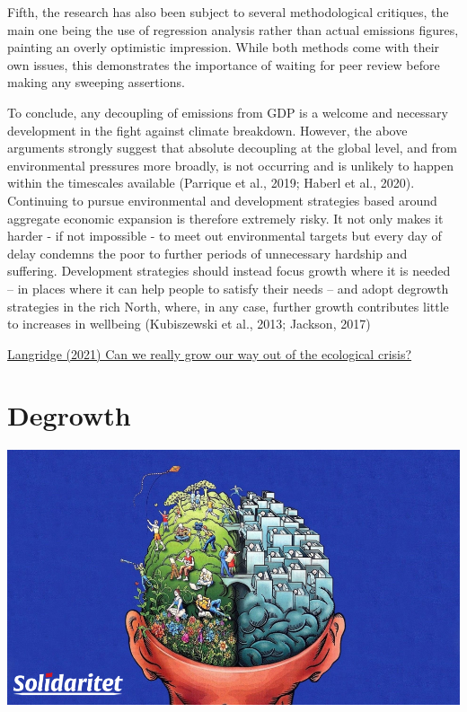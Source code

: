 \documentclass[
]{book}
\begin{document}
Fifth, the research has also been subject to several methodological critiques, the main one being the use of regression analysis rather than actual emissions figures, painting an overly optimistic impression. While both methods come with their own issues, this demonstrates the importance of waiting for peer review before making any sweeping assertions.

To conclude, any decoupling of emissions from GDP is a welcome and necessary development in the fight against climate breakdown. However, the above arguments strongly suggest that absolute decoupling at the global level, and from environmental pressures more broadly, is not occurring and is unlikely to happen within the timescales available (Parrique et al., 2019; Haberl et al., 2020). Continuing to pursue environmental and development strategies based around aggregate economic expansion is therefore extremely risky. It not only makes it harder - if not impossible - to meet out environmental targets but every day of delay condemns the poor to further periods of unnecessary hardship and suffering. Development strategies should instead focus growth where it is needed -- in places where it can help people to satisfy their needs -- and adopt degrowth strategies in the rich North, where, in any case, further growth contributes little to increases in wellbeing (Kubiszewski et al., 2013; Jackson, 2017)

\href{https://blogs.bath.ac.uk/cds/2021/05/18/can-we-really-grow-our-way-out-of-the-ecological-crisis/}{Langridge (2021) Can we really grow our way out of the ecological crisis?}

\hypertarget{degrowth}{%
\chapter{Degrowth}\label{degrowth}}

\includegraphics{fig/degrowth_brain.png}
\end{document}

